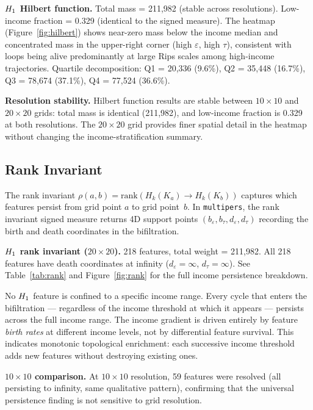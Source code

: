 \textbf{$H_{1}$ Hilbert function.} Total mass = 211,982 (stable across
resolutions). Low-income fraction = 0.329 (identical to the signed measure).
The heatmap (Figure~\ref{fig:hilbert}) shows near-zero mass below the income
median and concentrated mass in the upper-right corner (high $\varepsilon$,
high $\tau$), consistent with loops being alive predominantly at large Rips
scales among high-income trajectories. Quartile decomposition:
Q1 = 20,336 (9.6\%),
Q2 = 35,448 (16.7\%),
Q3 = 78,674 (37.1\%),
Q4 = 77,524 (36.6\%).

\textbf{Resolution stability.} Hilbert function results are stable between
$10 \times 10$ and $20 \times 20$ grids: total mass is identical
(211,982), and low-income fraction is 0.329 at both resolutions. The
$20 \times 20$ grid provides finer spatial detail in the heatmap without
changing the income-stratification summary.

\subsection{Rank Invariant}

The rank invariant $\rho(a, b) = \text{rank}(H_k(K_a) \to H_k(K_b))$
captures which features persist from grid point $a$ to grid point~$b$. In
\texttt{multipers}, the rank invariant signed measure returns 4D support
points $(b_\varepsilon, b_\tau, d_\varepsilon, d_\tau)$ recording the birth
and death coordinates in the bifiltration.

\textbf{$H_{1}$ rank invariant ($20 \times 20$).} 218 features, total
weight = 211,982. All 218 features have death coordinates at infinity
($d_\varepsilon = \infty$, $d_\tau = \infty$). See
Table~\ref{tab:rank} and Figure~\ref{fig:rank} for the full income
persistence breakdown.

No $H_{1}$ feature is confined to a specific income range. Every cycle that
enters the bifiltration --- regardless of the income threshold at which it
appears --- persists across the full income range. The income gradient is
driven entirely by feature \emph{birth rates} at different income levels, not
by differential feature survival. This indicates monotonic topological
enrichment: each successive income threshold adds new features without
destroying existing ones.

\textbf{$10 \times 10$ comparison.} At $10 \times 10$ resolution, 59
features were resolved (all persisting to infinity, same qualitative
pattern), confirming that the universal persistence finding is not sensitive
to grid resolution.

